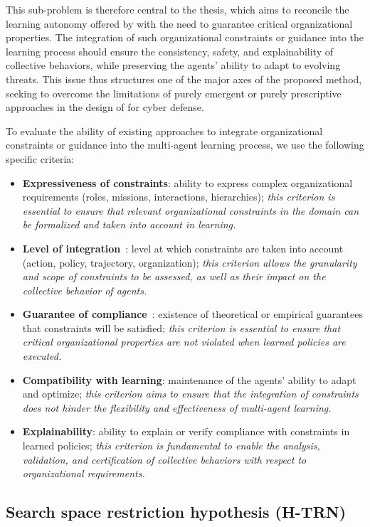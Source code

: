 This sub-problem is therefore central to the thesis, which aims to reconcile the learning autonomy offered by  with the need to guarantee critical organizational properties. The integration of such organizational constraints or guidance into the learning process should ensure the consistency, safety, and explainability of collective behaviors, while preserving the agents' ability to adapt to evolving threats. This issue thus structures one of the major axes of the proposed method, seeking to overcome the limitations of purely emergent or purely prescriptive approaches in the design of  for cyber defense.

To evaluate the ability of existing approaches to integrate organizational constraints or guidance into the multi-agent learning process, we use the following specific criteria:
\begin{itemize}
  \item \textbf{Expressiveness of constraints}: ability to express complex organizational requirements (roles, missions, interactions, hierarchies);
        \emph{this criterion is essential to ensure that relevant organizational constraints in the domain can be formalized and taken into account in learning.}
  \item \textbf{Level of integration}~: level at which constraints are taken into account (action, policy, trajectory, organization); \emph{this criterion allows the granularity and scope of constraints to be assessed, as well as their impact on the collective behavior of agents.}
  \item \textbf{Guarantee of compliance}~: existence of theoretical or empirical guarantees that constraints will be satisfied; \emph{this criterion is essential to ensure that critical organizational properties are not violated when learned policies are executed.}
  \item \textbf{Compatibility with learning}: maintenance of the agents' ability to adapt and optimize; \emph{this criterion aims to ensure that the integration of constraints does not hinder the flexibility and effectiveness of multi-agent learning.}
  \item \textbf{Explainability}: ability to explain or verify compliance with constraints in learned policies; \emph{this criterion is fundamental to enable the analysis, validation, and certification of collective behaviors with respect to organizational requirements.}
\end{itemize}

\subsection*{Search space restriction hypothesis (\textbf{H-TRN})}

